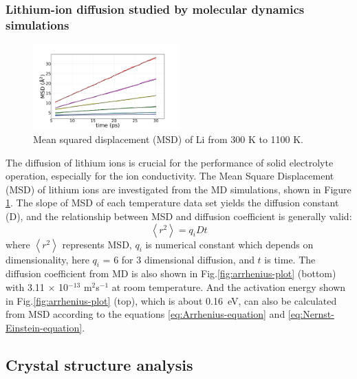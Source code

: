 \documentclass[twoside,twocolumn,9pt]{article}
\begin{document}
\subsubsection{Lithium-ion diffusion studied by molecular dynamics simulations}

\begin{figure}[t]
\centering
\includegraphics[width=0.5\textwidth]{Pics/MSD.pdf}
\caption{Mean squared displacement (MSD) of Li from 300 K to 1100 K.}
\label{fig:msd}
\end{figure}

The diffusion of lithium ions is crucial for the performance of solid electrolyte operation, especially for the ion conductivity.
The Mean Square Displacement (MSD) of lithium ions are investigated from the MD simulations, shown in Figure \ref{fig:msd}.
The slope of MSD of each temperature data set yields the diffusion constant (D), and the relationship between MSD and diffusion coefficient is generally valid:
\begin{equation}
\left< r^2 \right>=q_iDt
\end{equation}
where $\left< r^2 \right>$ represents MSD, $q_i$ is numerical constant which depends on dimensionality, here $q_i$ = 6 for 3 dimensional diffusion,
and $t$ is time. The diffusion coefficient from MD is also shown in Fig.\ref{fig:arrhenius-plot} (bottom) with 3.11 $\times$ 10$^{-13}$ m$^2$s$^{-1}$ at room temperature.
And the activation energy shown in Fig.\ref{fig:arrhenius-plot} (top), which is about 0.16~eV, can also be calculated from MSD according to the equations \ref{eq:Arrhenius-equation} and \ref{eq:Nernst-Einstein-equation}.


\subsection{Crystal structure analysis}
\end{document}
